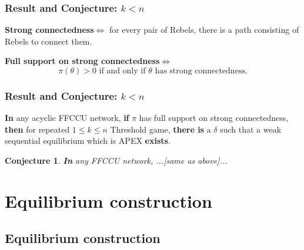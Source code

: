 \documentclass[10pt]{beamer}
\newtheorem{conjecture}{Conjecture}[section]
\begin{document}
\begin{frame}
  \frametitle{Result and Conjecture: $k<n$}


\begin{definition}
\textbf{Strong connectedness}$\Leftrightarrow$ for every pair of Rebels, there is a path consisting of Rebels to connect them.
\end{definition}  

\begin{definition}
\textbf{Full support on strong connectedness}$\Leftrightarrow$ 
\[\text{$\pi(\theta)>0$ if and only if $\theta$ has strong connectedness.}\]


\end{definition}  

\end{frame}





\begin{frame}
  \frametitle{Result and Conjecture: $k<n$}



\begin{theorem}
\label{thm_main_result}
\textbf{In} any {acyclic} FFCCU network, \textbf{if} $\pi$ has full support  {on strong connectedness}, \textbf{then} for repeated $1\leq k \leq n$ Threshold game, \textbf{there is} a $\delta$ such that a {weak} sequential equilibrium which is APEX \textbf{exists}.
\end{theorem}

\begin{conjecture}
\textbf{In} any FFCCU network, ...[same as above]...
\end{conjecture}

\end{frame}

\section{Equilibrium construction}
\subsection{Equilibrium construction}
\end{document}
